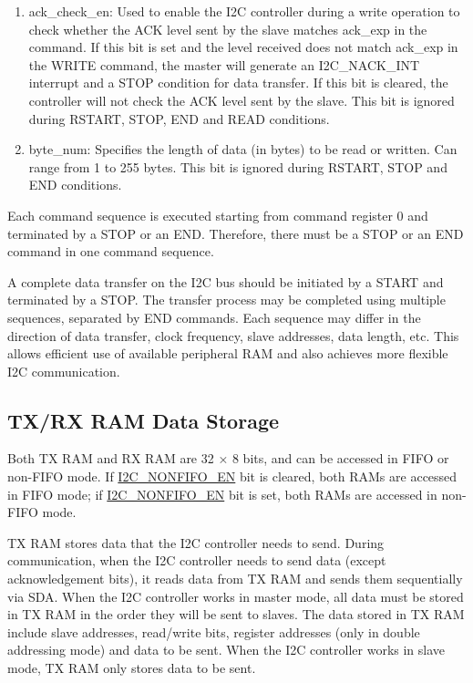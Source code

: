 \documentclass[main\_\_EN.tex]{subfiles}
\begin{document}
\begin{enumerate}
\item ack\_check\_en: Used to enable the I2C controller during a write operation to check whether the ACK level sent by the slave matches ack\_exp in the command. If this bit is set and the level received does not match ack\_exp in the WRITE command, the master will generate an I2C\_NACK\_INT interrupt and a STOP condition for data transfer. If this bit is cleared, the controller will not check the ACK level sent by the slave. This bit is ignored during RSTART, STOP, END and READ conditions.

\item byte\_num: Specifies the length of data (in bytes) to be read or written. Can range from 1 to 255 bytes. This bit is ignored during RSTART, STOP and END conditions.
\end{enumerate}

Each command sequence is executed starting from command register 0 and terminated by a STOP or an END. Therefore, there must be a STOP or an END command in one command sequence.

A complete data transfer on the I2C bus should be initiated by a START and terminated by a STOP. The transfer process may be completed using multiple sequences, separated by END commands. Each sequence may differ in the direction of data transfer, clock frequency, slave addresses, data length, etc. This allows efficient use of available peripheral RAM and also achieves more flexible I2C communication.

\subsection{TX/RX RAM Data Storage}\label{subsubsec:i2c-txrx}
Both TX RAM and RX RAM are 32 × 8 bits, and can be accessed in FIFO or non-FIFO mode. If \hyperref[fielddesc:I2CNONFIFOEN]{I2C\_NONFIFO\_EN} bit is cleared, both RAMs are accessed in FIFO mode; if \hyperref[fielddesc:I2CNONFIFOEN]{I2C\_NONFIFO\_EN} bit is set, both RAMs are accessed in non-FIFO mode.

TX RAM stores data that the I2C controller needs to send. During communication, when the I2C controller needs to send data (except acknowledgement bits), it reads data from TX RAM and sends them sequentially via SDA. When the I2C controller works in master mode, all data must be stored in TX RAM in the order they will be sent to slaves. The data stored in TX RAM include slave addresses, read/write bits, register addresses (only in double addressing mode) and data to be sent. When the I2C controller works in slave mode, TX RAM only stores data to be sent.
\end{document}

